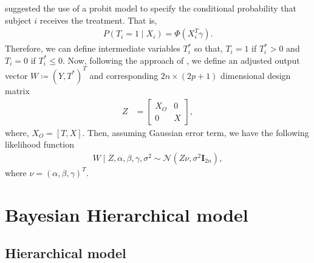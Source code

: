 \documentclass{amsart}
\newcommand{\normal}{\mathcal{N}}
\begin{document}
\citet{koch2020} suggested the use of a probit model to specify the conditional probability that
subject $i$ receives the treatment. That is,
\begin{align}
    P(T_i=1\mid X_i) = \Phi(X_i^T\gamma).
\end{align}
Therefore, we can define intermediate variables $T_i^*$ so that, $T_i=1$ if $T_i^*>0$ and
$T_i=0$ if $T_i^*\le0$. Now, following the approach of \citet{koch2018}, we define an adjusted
output vector $W\coloneqq(Y, T^*)^T$ and corresponding $2n\times(2p+1)$ dimensional design matrix
\begin{align}
    Z &=
    \begin{bmatrix}
     X_O & 0 \\
     0 & X
    \end{bmatrix},
\end{align}
where, $X_O = [T, X]$. Then, assuming Gaussian error term, we have the following likelihood function
\begin{align}
W\mid Z, \alpha, \beta, \gamma, \sigma^2 \sim\normal\left(Z\nu, \sigma^2\mathbf{I}_{2n}\right),
\end{align}
where $\nu = (\alpha, \beta, \gamma)^T$.

\section{Bayesian Hierarchical model}\label{sec:bayes}
\subsection{Hierarchical model}
\end{document}

